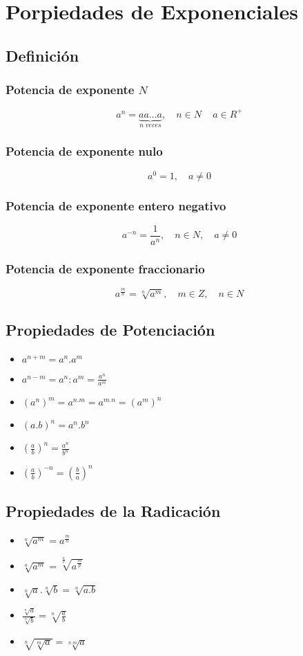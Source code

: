 \section{Porpiedades de Exponenciales}
\subsection{Definición}
\subsubsection{Potencia de exponente $N$}
\[ a^n= \underbrace{aa \ldots a}_{n \; veces}, \quad n \in N\, \quad a \in R^{+} \]
\subsubsection{Potencia de exponente nulo}
\[ a^0=1, \quad a \neq 0\]
\subsubsection{Potencia de exponente entero negativo}
\[ a^{-n}= \frac{1}{a^n}, \quad n \in N, \quad a \neq 0\]
\subsubsection{Potencia de exponente fraccionario}
\[ a^{\frac{m}{n}}= \sqrt[n]{a^m}, \quad m \in Z, \quad n \in N \]
\subsection{Propiedades de Potenciación}
\begin{itemize}
 \item $ a^{n+m}=a^n.a^m $
 \item $ a^{n-m}=a^n:a^m= \frac{a^n}{a^m} $
 \item $ (a^n)^m=a^{n.m}=a^{m.n}=(a^m)^n $
 \item $ (a.b)^n=a^n. b^n $
 \item $ (\frac{a}{b})^n = \frac{a^n}{b^n}$
 \item $ (\frac{a}{b})^{-n}= (\frac{b}{a})^{n} $
 
\end{itemize}

\subsection{Propiedades de la Radicación}
\begin{itemize}
 \item $ \sqrt[n]{a^{m}}=a^{\frac{m}{n}} $
 \item $ \sqrt[n]{a^{m}}= \sqrt[\frac{n}{p}]{a^{\frac{m}{p}}} $
 \item $ \sqrt[n]{a}. \sqrt[n]{b} = \sqrt[n]{a.b} $
 \item $ \frac{\sqrt[n]{a}}{\sqrt[n]{b}} = \sqrt[n]{\frac{a}{b}} $
 \item $ \sqrt[n]{\sqrt[m]{a}}= \sqrt[n.m]{a}$
\end{itemize}
